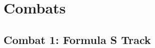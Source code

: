 \documentclass[a4paper]{article}
\begin{document}
\begin{comment}
\vspace{-0.5cm} \hspace{-18pt} \subsubsection{Blank Component 2} \label{blank_component2} \vspace{-0.2cm}
Component description
\\ \pbhw
{}
{}
{}
{}

\end{comment}


\newpage

\section{Combats}

\subsection{Combat 1: Formula S Track} \label{combat_1}
\end{document}
